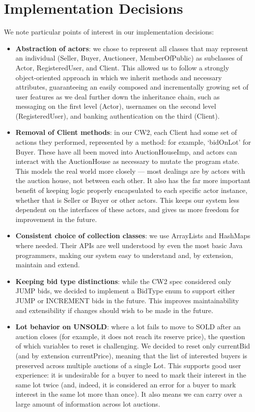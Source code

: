 \documentclass[titlepage, 12pt]{extarticle}
\begin{document}
\section{Implementation Decisions}
We note particular points of interest in our implementation decisions:
\begin{itemize}
    \item {\bf Abstraction of actors}: we chose to represent all classes that may represent an individual (Seller, Buyer, Auctioneer, MemberOfPublic) as subclasses of Actor, RegisteredUser, and Client. This allowed us to follow a strongly object-oriented approach in which we inherit methods and necessary attributes, guaranteeing an easily composed and incrementally growing set of user features as we deal further down the inheritance chain, such as messaging on the first level (Actor), usernames on the second level (RegisteredUser), and banking authentication on the third (Client).
    \item {\bf Removal of Client methods}: in our CW2, each Client had some set
        of actions they performed, represented by a method: for example,
        `bidOnLot' for Buyer. These have all been moved into AuctionHouseImp, and actors can interact with the AuctionHouse as necessary to mutate the program state. This models the real world more closely --- most dealings are by actors with the auction house, not between each other. It also has the far more important benefit of keeping logic properly encapsulated to each specific actor instance, whether that is Seller or Buyer or other actors. This keeps our system less dependent on the interfaces of these actors, and gives us more freedom for improvement in the future.
    \item {\bf Consistent choice of collection classes}: we use ArrayLists and
      HashMaps where needed. Their APIs are well understood by even the most basic Java programmers, making our system easy to understand and, by extension, maintain and extend.
    \item {\bf Keeping bid type distinctions}: while the CW2 spec considered only JUMP bids, we decided to implement a BidType enum to support either JUMP or INCREMENT bids in the future. This improves maintainability and extensibility if changes should wish to be made in the future. 
    \item {\bf Lot behavior on UNSOLD}: where a lot fails to move to SOLD after an auction closes (for example, it does not reach its reserve price), the question of which variables to reset is challenging. We decided to reset only currentBid (and by extension currentPrice), meaning that the list of interested buyers is preserved across multiple auctions of a single Lot. This supports good user experience: it is undesirable for a buyer to need to mark their interest in the same lot twice (and, indeed, it is considered an error for a buyer to mark interest in the same lot more than once). It also means we can carry over a large amount of information across lot auctions.
\end{itemize}



\end{document}
